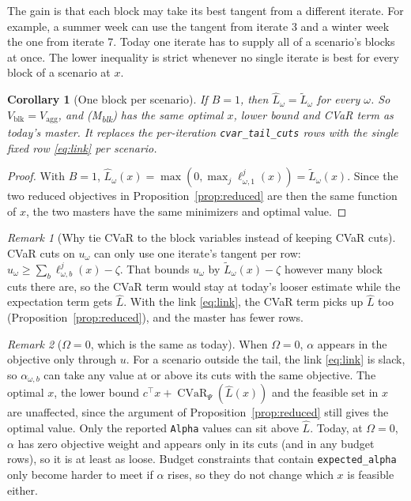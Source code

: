 \documentclass[11pt]{article}
\newtheorem{corollary}{Corollary}
\theoremstyle{remark}
\newtheorem*{remark}{Remark}
\newcommand{\Lh}{\widehat{L}}
\newcommand{\Lt}{\widetilde{L}}
\newcommand{\CVaR}{\operatorname{CVaR}}
\begin{document}
\noindent The gain is that each block may take its best tangent from a different iterate. For
example, a summer week can use the tangent from iterate 3 and a winter week the one from iterate 7.
Today one iterate has to supply all of a scenario's blocks at once. The lower inequality is strict
whenever no single iterate is best for every block of a scenario at $x$.

\begin{corollary}[One block per scenario]\label{cor:b1}
If $B = 1$, then $\Lh_\omega = \Lt_\omega$ for every $\omega$. So $V_{\text{blk}} = V_{\text{agg}}$, and
(M\textsubscript{blk}) has the same optimal $x$, lower bound and CVaR term as today's master. It
replaces the per-iteration \texttt{cvar\_tail\_cuts} rows with the single fixed row
\eqref{eq:link} per scenario.
\end{corollary}

\begin{proof}
With $B = 1$, $\Lh_\omega(x) = \max(0, \max_j \ell^j_{\omega,1}(x)) = \Lt_\omega(x)$. Since the two
reduced objectives in Proposition~\ref{prop:reduced} are then the same function of $x$, the two
masters have the same minimizers and optimal value.
\end{proof}

\begin{remark}[Why tie CVaR to the block variables instead of keeping CVaR cuts]
CVaR cuts on $u_\omega$ can only use one iterate's tangent per row:
$u_\omega \ge \sum_b \ell^j_{\omega,b}(x) - \zeta$. That bounds $u_\omega$ by $\Lt_\omega(x) - \zeta$
however many block cuts there are, so the CVaR term would stay at today's looser estimate while the
expectation term gets $\Lh$. With the link \eqref{eq:link}, the CVaR term picks up $\Lh$ too
(Proposition~\ref{prop:reduced}), and the master has fewer rows.
\end{remark}

\begin{remark}[$\Omega = 0$, which is the same as today]
When $\Omega = 0$, $\alpha$ appears in the objective only through $u$. For a scenario outside the
tail, the link \eqref{eq:link} is slack, so $\alpha_{\omega,b}$ can take any value at or above its
cuts with the same objective. The optimal $x$, the lower bound
$c^\top x + \CVaR_\Psi(\Lh(x))$ and the feasible set in $x$ are unaffected, since the argument of
Proposition~\ref{prop:reduced} still gives the optimal value. Only the reported \texttt{Alpha}
values can sit above $\Lh$. Today, at $\Omega = 0$, $\alpha$ has zero objective weight and appears only
in its cuts (and in any budget rows), so it is at least as loose. Budget constraints that contain \texttt{expected\_alpha}
only become harder to meet if $\alpha$ rises, so they do not change which $x$ is feasible either.
\end{remark}
\end{document}
